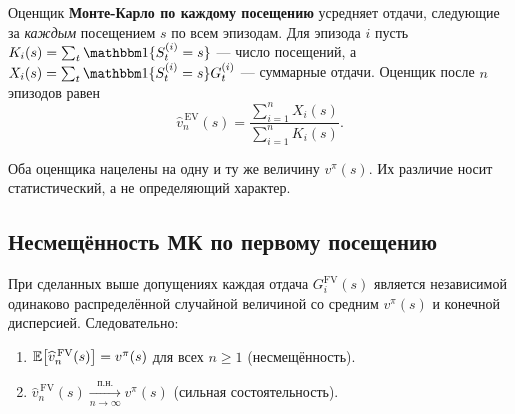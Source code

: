 \begin{definition}
\label{def:every-visit-mc}
Оценщик \textbf{Монте-Карло по каждому посещению} усредняет отдачи, следующие за \emph{каждым} посещением $s$ по всем эпизодам.  Для эпизода $i$ пусть $K_i(s) = \sum_t \ind\{S_t^{(i)} = s\}$ --- число посещений, а $X_i(s) = \sum_t \ind\{S_t^{(i)} = s\} G_t^{(i)}$ --- суммарные отдачи.  Оценщик после $n$ эпизодов равен
\begin{equation}
  \label{eq:ev-estimator}
  \widehat{v}_n^{\,\mathrm{EV}}(s) = \frac{\sum_{i=1}^{n} X_i(s)}{\sum_{i=1}^{n} K_i(s)}.
\end{equation}
\end{definition}

Оба оценщика нацелены на одну и ту же величину $v^\pi(s)$.  Их различие носит статистический, а не определяющий характер.

\subsection*{Несмещённость МК по первому посещению}

\begin{theorem}
\label{thm:fv-unbiased}
При сделанных выше допущениях каждая отдача $G_i^{\mathrm{FV}}(s)$ является независимой одинаково распределённой случайной величиной со средним $v^\pi(s)$ и конечной дисперсией.  Следовательно:
\begin{enumerate}
  \item $\operatorname{\mathbb{E}}\!\left[\widehat{v}_n^{\,\mathrm{FV}}(s)\right] = v^\pi(s)$ для всех $n \ge 1$ (несмещённость).
  \item $\widehat{v}_n^{\,\mathrm{FV}}(s) \xrightarrow[n \to \infty]{\mbox{п.н.}} v^\pi(s)$ (сильная состоятельность).
\end{enumerate}
\end{theorem}

